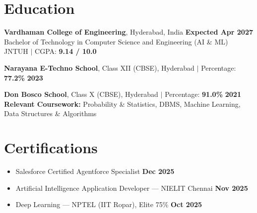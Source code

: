 \documentclass[11pt,a4paper]{article}
\begin{document}
\section{Education}
\vspace{1pt}
\textbf{Vardhaman College of Engineering}, Hyderabad, India \hfill \textbf{Expected Apr 2027}\\
Bachelor of Technology in Computer Science and Engineering (AI \& ML)\\
JNTUH $\vert$ CGPA: \textbf{9.14 / 10.0}

\vspace{1pt}
\textbf{Narayana E-Techno School}, Class XII (CBSE), Hyderabad $\vert$ Percentage: \textbf{77.2\%} \hfill \textbf{2023}

\vspace{2pt}
\textbf{Don Bosco School}, Class X (CBSE), Hyderabad $\vert$ Percentage: \textbf{91.0\%} \hfill \textbf{2021}\\
\textbf{Relevant Coursework:} Probability \& Statistics, DBMS, Machine Learning, Data Structures \& Algorithms
\section{Certifications}
\vspace{2pt}
\begin{itemize}
\item Salesforce Certified Agentforce Specialist \hfill \textbf{Dec 2025}
\item Artificial Intelligence Application Developer — NIELIT Chennai \hfill \textbf{Nov 2025}
\item Deep Learning — NPTEL (IIT Ropar), Elite 75\% \hfill \textbf{Oct 2025}
\end{itemize}
\end{document}
